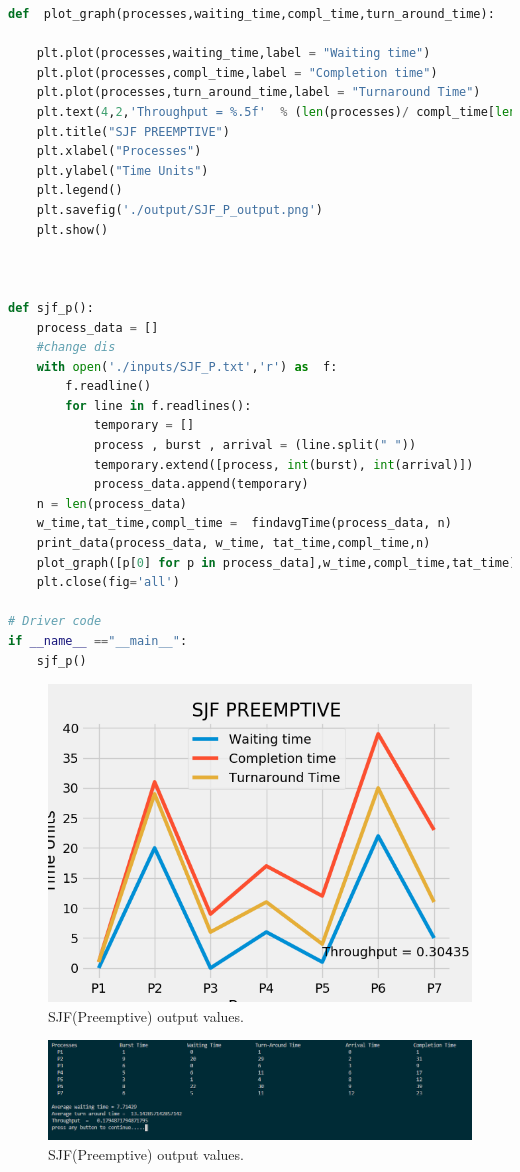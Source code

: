 \documentclass[11pt,a4paper]{report}
\begin{document}
\begin{lstlisting}[language=Python,caption=SJF Preemptive Source code,breaklines=true,postbreak=\mbox{\textcolor{red}{$\hookrightarrow$}\space},]
def  plot_graph(processes,waiting_time,compl_time,turn_around_time):

	plt.plot(processes,waiting_time,label = "Waiting time")
	plt.plot(processes,compl_time,label = "Completion time")
	plt.plot(processes,turn_around_time,label = "Turnaround Time")
	plt.text(4,2,'Throughput = %.5f'  % (len(processes)/ compl_time[len(processes)-1]))
	plt.title("SJF PREEMPTIVE")
	plt.xlabel("Processes")
	plt.ylabel("Time Units")
	plt.legend()
	plt.savefig('./output/SJF_P_output.png')
	plt.show()



def sjf_p():
	process_data = []
	#change dis
	with open('./inputs/SJF_P.txt','r') as  f:
		f.readline()
		for line in f.readlines():
			temporary = []
			process , burst , arrival = (line.split(" "))
			temporary.extend([process, int(burst), int(arrival)])
			process_data.append(temporary)
	n = len(process_data)
	w_time,tat_time,compl_time =  findavgTime(process_data, n) 
	print_data(process_data, w_time, tat_time,compl_time,n)
	plot_graph([p[0] for p in process_data],w_time,compl_time,tat_time)
	plt.close(fig='all')

# Driver code  
if __name__ =="__main__": 
	sjf_p()


\end{lstlisting}
{\begin{figure}[H]
	\centering
	\includegraphics[scale=0.75]{./img/SJF_P_output.png}
	\caption{SJF(Preemptive) output values.}
\end{figure}}

{\begin{figure}[H]
	\centering
	\includegraphics[scale=0.5]{./img/sjf_p_out.PNG}
	\caption{SJF(Preemptive) output values.}
\end{figure}}
\end{document}
